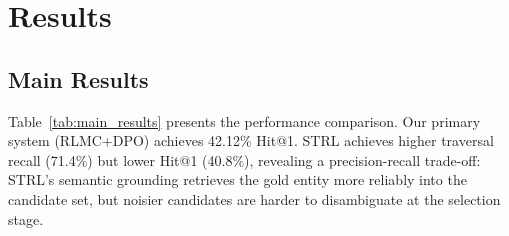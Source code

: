 \documentclass[10pt,conference]{IEEEtran}
\begin{document}

\section{Results}

\subsection{Main Results}

Table~\ref{tab:main_results} presents the performance comparison. Our primary system (RLMC+DPO) achieves 42.12\% Hit@1. STRL achieves higher traversal recall (71.4\%) but lower Hit@1 (40.8\%), revealing a precision-recall trade-off: STRL's semantic grounding retrieves the gold entity more reliably into the candidate set, but noisier candidates are harder to disambiguate at the selection stage.

\begin{table}[!ht]
\centering
\caption{Results on CWQ (dev set). CWQ test labels not publicly released; dev is the standard reported split~\cite{sun2018open,he2021improving,shi2021transfernet}. $\dagger$EmbedKGQA CWQ number approximate (primarily WebQSP). LLM systems (e.g.\ ToG~\cite{sun2024tog}, GPT-4, 54\%+) not directly comparable.}
\label{tab:main_results}
\end{table}
\end{document}
